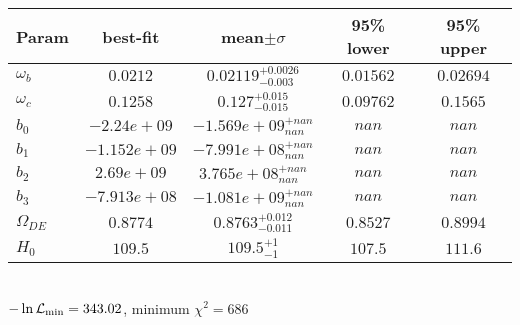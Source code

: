 \begin{tabular}{|l|c|c|c|c|} 
 \hline 
Param & best-fit & mean$\pm\sigma$ & 95\% lower & 95\% upper \\ \hline 
$\omega_b$ &$0.0212$ & $0.02119_{-0.003}^{+0.0026}$ & $0.01562$ & $0.02694$ \\ 
$\omega_c$ &$0.1258$ & $0.127_{-0.015}^{+0.015}$ & $0.09762$ & $0.1565$ \\ 
$b_{0 }$ &$-2.24e+09$ & $-1.569e+09_{nan}^{+nan}$ & $nan$ & $nan$ \\ 
$b_{1 }$ &$-1.152e+09$ & $-7.991e+08_{nan}^{+nan}$ & $nan$ & $nan$ \\ 
$b_{2 }$ &$2.69e+09$ & $3.765e+08_{nan}^{+nan}$ & $nan$ & $nan$ \\ 
$b_{3 }$ &$-7.913e+08$ & $-1.081e+09_{nan}^{+nan}$ & $nan$ & $nan$ \\ 
$\Omega_{DE}$ &$0.8774$ & $0.8763_{-0.011}^{+0.012}$ & $0.8527$ & $0.8994$ \\ 
$H_{0 }$ &$109.5$ & $109.5_{-1}^{+1}$ & $107.5$ & $111.6$ \\ 
\hline 
 \end{tabular} \\ 
$-\ln{\cal L}_\mathrm{min} =343.02$, minimum $\chi^2=686$ \\ 

